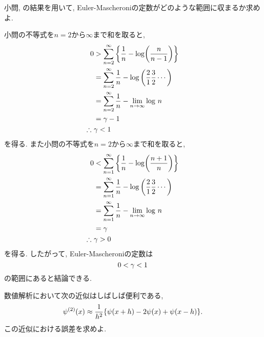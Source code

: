 \begin{qparts}
\begin{qlist}
            \qitem 小問, の結果を用いて, Euler-Mascheroniの定数がどのような範囲に収まるか求めよ. 

            小問の不等式を$n=2$から$\infty$まで和を取ると, 
            \begin{align}
                0 &> \sum_{n=2}^{\infty}\qty{\frac{1}{n}-\mathrm{log}\qty(\frac{n}{n-1})} \notag \\
                &= \sum_{n=2}^{\infty}\frac{1}{n}-\mathrm{log}\left(\frac{2}{1}\frac{3}{2}\cdots\right) \notag \\
                &= \sum_{n=2}^{\infty}\frac{1}{n}-\lim_{n\to\infty}\mathrm{log}\ n \notag \\
                &= \gamma -1 \notag \\
                \therefore\ &\gamma<1 \notag
            \end{align}
            を得る. また小問の不等式を$n=2$から$\infty$まで和を取ると, 
            \begin{align}
                0 &< \sum_{n=1}^{\infty}\qty{\frac{1}{n}-\mathrm{log}\qty(\frac{n+1}{n})} \notag \\
                &= \sum_{n=1}^{\infty}\frac{1}{n}-\mathrm{log}\left(\frac{2}{1}\frac{3}{2}\cdots\right) \notag \\
                &= \sum_{n=1}^{\infty}\frac{1}{n}-\lim_{n\to\infty}\mathrm{log}\ n \notag \\
                &= \gamma \notag \\
                \therefore\ &\gamma>0 \notag
            \end{align}
            を得る. したがって, Euler-Mascheroniの定数は
            \begin{equation}
                0<\gamma<1 \notag
            \end{equation}
            の範囲にあると結論できる. 
        \end{qlist}

    \qpart 数値解析において次の近似はしばしば便利である, 
    \begin{equation}
        \psi^{(2)}(x) \approx \frac{1}{h^2}\lbrace\psi(x+h)-2\psi(x)+\psi(x-h)\rbrace . \notag
    \end{equation}
    この近似における誤差を求めよ. 


\end{qparts}

